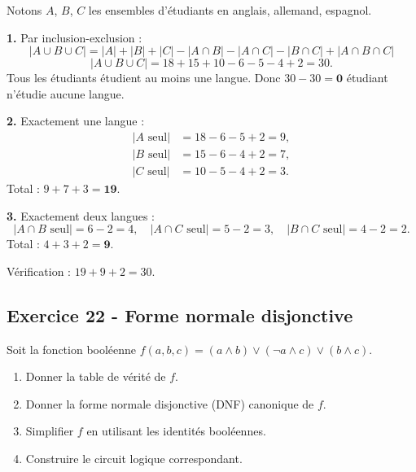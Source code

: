 \documentclass[12pt,a4paper]{article}
\begin{document}
\begin{boitecorrige}
Notons $A$, $B$, $C$ les ensembles d'étudiants en anglais, allemand, espagnol.

\textbf{1.} Par inclusion-exclusion :
\[
|A\cup B\cup C| = |A|+|B|+|C| - |A\cap B| - |A\cap C| - |B\cap C| + |A\cap B\cap C|
\]
\[
|A\cup B\cup C| = 18+15+10 - 6 - 5 - 4 + 2 = 30.
\]
Tous les étudiants étudient au moins une langue. Donc $30 - 30 = \mathbf{0}$ étudiant n'étudie aucune langue.

\textbf{2.} Exactement une langue :
\begin{align*}
|A\text{ seul}| &= 18-6-5+2 = 9,\\
|B\text{ seul}| &= 15-6-4+2 = 7,\\
|C\text{ seul}| &= 10-5-4+2 = 3.
\end{align*}
Total : $9+7+3 = \mathbf{19}$.

\textbf{3.} Exactement deux langues :
\[
|A\cap B\text{ seul}| = 6-2 = 4,\quad |A\cap C\text{ seul}| = 5-2 = 3,\quad |B\cap C\text{ seul}| = 4-2 = 2.
\]
Total : $4+3+2 = \mathbf{9}$.

Vérification : $19 + 9 + 2 = 30$. \checkmark
{}
\end{boitecorrige}

\subsection*{Exercice 22 - Forme normale disjonctive \niveau{\difficile}}

\begin{boiteexercice}
Soit la fonction booléenne $f(a,b,c) = (a\wedge b)\vee(\neg a \wedge c) \vee (b\wedge c)$.
\begin{enumerate}
  \item Donner la table de vérité de $f$.
  \item Donner la forme normale disjonctive (DNF) canonique de $f$.
  \item Simplifier $f$ en utilisant les identités booléennes.
  \item Construire le circuit logique correspondant.
\end{enumerate}
\end{boiteexercice}
\end{document}
